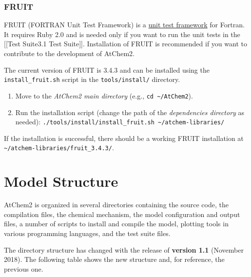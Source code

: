 \subsubsection{FRUIT} \label{fruit}

FRUIT (FORTRAN Unit Test Framework) is a
\href{https://en.wikipedia.org/wiki/Unit_testing}{unit test framework}
for Fortran. It requires Ruby 2.0 and is needed only if you want to run
the unit tests in the {[}{[}Test Suite\textbar{}3.1 Test Suite{]}{]}.
Installation of FRUIT is recommended if you want to contribute to the
development of AtChem2.

The current version of FRUIT is 3.4.3 and can be installed using the
\texttt{install\_fruit.sh} script in the \texttt{tools/install/}
directory.

\begin{enumerate}
\def\labelenumi{\arabic{enumi}.}
\item
  Move to the \emph{AtChem2 main directory} (e.g.,
  \texttt{cd\ \textasciitilde{}/AtChem2}).
\item
  Run the installation script (change the path of the \emph{dependencies
  directory} as needed):
  \texttt{./tools/install/install\_fruit.sh\ \textasciitilde{}/atchem-libraries/}
\end{enumerate}

If the installation is successful, there should be a working FRUIT
installation at
\texttt{\textasciitilde{}/atchem-libraries/fruit\_3.4.3/}.

\section{Model Structure} \label{sec:structure}

AtChem2 is organized in several directories containing the source code,
the compilation files, the chemical mechanism, the model configuration
and output files, a number of scripts to install and compile the model,
plotting tools in various programming languages, and the test suite
files.

The directory structure has changed with the release of \textbf{version
1.1} (November 2018). The following table shows the new structure and,
for reference, the previous one.

